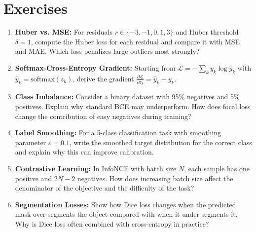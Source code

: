 \section{Exercises}

\begin{enumerate}
    \item \textbf{Huber vs. MSE:} For residuals $r \in \{-3, -1, 0, 1, 3\}$ and Huber threshold $\delta = 1$, compute the Huber loss for each residual and compare it with MSE and MAE. Which loss penalizes large outliers most strongly?

    \item \textbf{Softmax-Cross-Entropy Gradient:} Starting from $\mathcal{L} = -\sum_k y_k \log \hat{y}_k$ with $\hat{y}_k = \text{softmax}(z_k)$, derive the gradient $\frac{\partial \mathcal{L}}{\partial z_k} = \hat{y}_k - y_k$.

    \item \textbf{Class Imbalance:} Consider a binary dataset with 95\% negatives and 5\% positives. Explain why standard BCE may underperform. How does focal loss change the contribution of easy negatives during training?

    \item \textbf{Label Smoothing:} For a 5-class classification task with smoothing parameter $\varepsilon = 0.1$, write the smoothed target distribution for the correct class and explain why this can improve calibration.

    \item \textbf{Contrastive Learning:} In InfoNCE with batch size $N$, each sample has one positive and $2N-2$ negatives. How does increasing batch size affect the denominator of the objective and the difficulty of the task?

    \item \textbf{Segmentation Losses:} Show how Dice loss changes when the predicted mask over-segments the object compared with when it under-segments it. Why is Dice loss often combined with cross-entropy in practice?
\end{enumerate}

